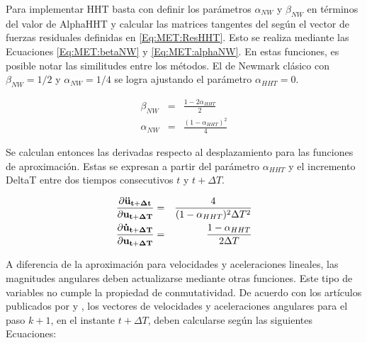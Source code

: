 Para implementar HHT basta con definir los parámetros $\alpha_{NW}$ y $\beta_{NW}$ en términos del valor de \gls{AlphaHHT} y calcular las matrices tangentes del según el vector de fuerzas residuales definidas en \ref{Eq:MET:ResHHT}. Esto se realiza mediante las Ecuaciones \eqref{Eq:MET:betaNW} y \eqref{Eq:MET:alphaNW}. En estas funciones, es posible notar las similitudes entre los métodos. El de Newmark clásico con $\beta_{NW}=1/2$ y $\alpha_{NW} =1/4$ se logra ajustando el parámetro $\alpha_{HHT}=0$. 

\begin{eqnarray}
	\label{Eq:MET:betaNW}
	\beta_{NW} &=& \frac{1-2\alpha_{HHT}}{2}\\
	\label{Eq:MET:alphaNW}
	\alpha_{NW} &=& \frac{(1-\alpha_{HHT})^2}{4}
\end{eqnarray}

Se calculan entonces las derivadas respecto al desplazamiento para las funciones de aproximación. Estas se expresan a partir del parámetro $\alpha_{HHT}$ y el incremento \gls{DeltaT} entre dos tiempos consecutivos $t$ y $t+\Delta T$.

\begin{eqnarray}
	\label{Eq:Met:DerivadasAcelLinear}
	\frac{\partial \bf{\ddot{u}_{t+\Delta t}}}{\partial \bf{{u}_{t+\Delta T}}}& = &
	\frac{4}{(1-\alpha_{HHT})^2 \Delta T^2}\\
	\label{Eq:Met:DerivadasVelLinear}
	\frac{\partial \bf{\dot{u}_{t+\Delta T}}}{\partial \bf{{u}_{t+\Delta T}}}& = &
	\frac{1-\alpha_{HHT}}{2\Delta T}
\end{eqnarray}

A diferencia de la aproximación para velocidades y aceleraciones lineales, las magnitudes angulares deben actualizarse mediante otras funciones. Este tipo de variables no cumple la propiedad de conmutatividad. De acuerdo con los artículos publicados por \cite{ibrahimbegovic1998finite} y \cite{ibrahimbegovic2002energy}, los vectores de velocidades y aceleraciones angulares para el paso $k+1$, en el instante $t+\Delta T$, deben calcularse según las siguientes Ecuaciones:


